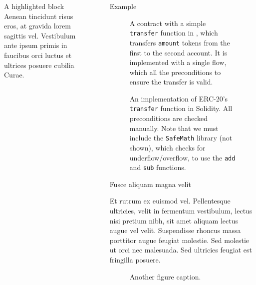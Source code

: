\documentclass[usenames, dvipsnames, final]{beamer}
\newlength{\sepwidth}
\newlength{\colwidth}
\newcommand{\separatorcolumn}{\begin{column}{\sepwidth}\end{column}}
\begin{document}
\begin{frame}[t]
\begin{columns}[t]
\begin{column}{\colwidth}
\begin{alertblock}{A highlighted block}
    Aenean tincidunt risus eros, at gravida lorem sagittis vel. Vestibulum ante
    ipsum primis in faucibus orci luctus et ultrices posuere cubilia Curae.

  \end{alertblock}

\end{column}

\separatorcolumn

\begin{column}{\colwidth}

  \begin{block}{Example}
    \begin{figure}[h]
        \centering
        
        \caption{A contract with a simple \lstinline{transfer} function in \langName, which transfers \lstinline{amount} tokens from the first to the second account.
    It is implemented with a single flow, which all the preconditions to ensure the transfer is valid.}
        \label{fig:erc20-transfer-flow}
    \end{figure}
    \begin{figure}[h]
        \centering
        
        \caption{An implementation of ERC-20's \lstinline{transfer} function in Solidity.
            All preconditions are checked manually.
            Note that we must include the \lstinline{SafeMath} library (not shown), which checks for underflow/overflow, to use the \lstinline{add} and \lstinline{sub} functions.}
        \label{fig:erc20-transfer-sol}
    \end{figure}
  \end{block}

  \begin{block}{Fusce aliquam magna velit}

    Et rutrum ex euismod vel. Pellentesque ultricies, velit in fermentum
    vestibulum, lectus nisi pretium nibh, sit amet aliquam lectus augue vel
    velit. Suspendisse rhoncus massa porttitor augue feugiat molestie. Sed
    molestie ut orci nec malesuada. Sed ultricies feugiat est fringilla
    posuere.

    \begin{figure}
      \centering
      \caption{Another figure caption.}
    \end{figure}


\end{block}
\end{column}
\end{columns}
\end{frame}
\end{document}
